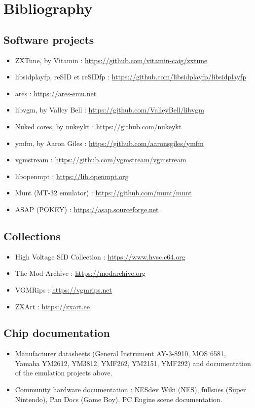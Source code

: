 \chapter{Bibliography}

\section*{Software projects}
\begin{itemize}
  \item ZXTune, by Vitamin : \url{https://github.com/vitamin-caig/zxtune}
  \item libsidplayfp, reSID et reSIDfp : \url{https://github.com/libsidplayfp/libsidplayfp}
  \item ares : \url{https://ares-emu.net}
  \item libvgm, by Valley Bell : \url{https://github.com/ValleyBell/libvgm}
  \item Nuked cores, by nukeykt : \url{https://github.com/nukeykt}
  \item ymfm, by Aaron Giles : \url{https://github.com/aaronsgiles/ymfm}
  \item vgmstream : \url{https://github.com/vgmstream/vgmstream}
  \item libopenmpt : \url{https://lib.openmpt.org}
  \item Munt (MT-32 emulator) : \url{https://github.com/munt/munt}
  \item ASAP (POKEY) : \url{https://asap.sourceforge.net}
\end{itemize}

\section*{Collections}
\begin{itemize}
  \item High Voltage SID Collection : \url{https://www.hvsc.c64.org}
  \item The Mod Archive : \url{https://modarchive.org}
  \item VGMRips : \url{https://vgmrips.net}
  \item ZXArt : \url{https://zxart.ee}
\end{itemize}

\section*{Chip documentation}
\begin{itemize}
  \item Manufacturer datasheets (General Instrument AY-3-8910, MOS 6581, Yamaha YM2612, YM3812, YMF262,
        YM2151, YMF292) and documentation of the emulation projects above.
  \item Community hardware documentation : NESdev Wiki (NES), fullsnes (Super Nintendo), Pan Docs
        (Game Boy), PC Engine scene documentation.
\end{itemize}

